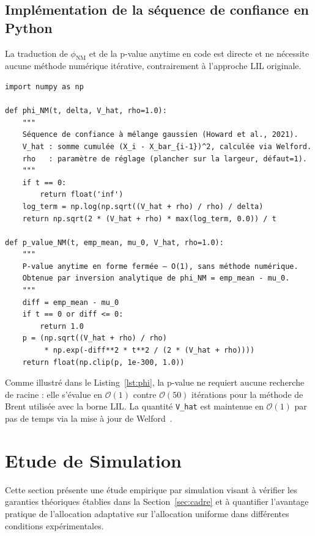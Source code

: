 \documentclass[11pt,a4paper]{article}
\newcommand{\calO}{\mathcal{O}}
\newcommand{\phinm}{\phi_{\mathrm{NM}}}
\begin{document}
\subsection{Implémentation de la séquence de confiance en Python}

La traduction de $\phinm$ et de la p-value anytime en code est directe
et ne nécessite aucune méthode numérique itérative, contrairement à
l'approche LIL originale.

\begin{lstlisting}[caption={Implémentation de la Normal Mixture Confidence Sequence}, label={lst:phi}]
import numpy as np

def phi_NM(t, delta, V_hat, rho=1.0):
    """
    Séquence de confiance à mélange gaussien (Howard et al., 2021).
    V_hat : somme cumulée (X_i - X_bar_{i-1})^2, calculée via Welford.
    rho   : paramètre de réglage (plancher sur la largeur, défaut=1).
    """
    if t == 0:
        return float('inf')
    log_term = np.log(np.sqrt((V_hat + rho) / rho) / delta)
    return np.sqrt(2 * (V_hat + rho) * max(log_term, 0.0)) / t

def p_value_NM(t, emp_mean, mu_0, V_hat, rho=1.0):
    """
    P-value anytime en forme fermée — O(1), sans méthode numérique.
    Obtenue par inversion analytique de phi_NM = emp_mean - mu_0.
    """
    diff = emp_mean - mu_0
    if t == 0 or diff <= 0:
        return 1.0
    p = (np.sqrt((V_hat + rho) / rho)
         * np.exp(-diff**2 * t**2 / (2 * (V_hat + rho))))
    return float(np.clip(p, 1e-300, 1.0))
\end{lstlisting}

Comme illustré dans le Listing~\ref{lst:phi}, la p-value ne requiert
aucune recherche de racine : elle s'évalue en $\calO(1)$ contre
$\calO(50)$ itérations pour la méthode de Brent utilisée avec la
borne LIL. La quantité \texttt{V\_hat} est maintenue en $\calO(1)$
par pas de temps via la mise à jour de Welford~\cite{welford1962}.


\section{Etude de Simulation}
\label{sec:simulation}


Cette section présente une étude empirique par simulation visant à vérifier
les garanties théoriques établies dans la Section~\ref{sec:cadre} et à
quantifier l'avantage pratique de l'allocation adaptative sur l'allocation
uniforme dans différentes conditions expérimentales.
\end{document}
